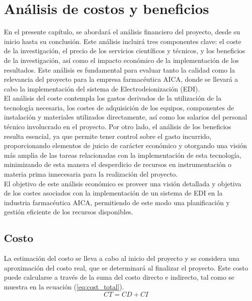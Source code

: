 \chapter{Análisis de costos y beneficios}
En el presente capítulo, se abordará el análisis financiero del proyecto, desde su inicio hasta su conclusión. Este análisis incluirá tres componentes clave: el coste de la investigación, el precio de los servicios científicos y técnicos, y los beneficios de la investigación, así como el impacto económico de la implementación de los resultados. Este análisis es fundamental para evaluar tanto la calidad como la relevancia del proyecto para la empresa farmacéutica AICA, donde se llevará a cabo la implementación del sistema de Electrodeionización (EDI).\\

El análisis del coste contempla los gastos derivados de la utilización de la tecnología necesaria, los costes de adquisición de los equipos, componentes de instalación y materiales utilizados directamente, así como los salarios del personal técnico involucrado en el proyecto. Por otro lado, el análisis de los beneficios resulta esencial, ya que permite tener control sobre el gasto incurrido, proporcionando elementos de juicio de carácter económico y otorgando una visión más amplia de las tareas relacionadas con la implementación de esta tecnología, minimizando de esta manera el desperdicio de recursos en instrumentación o materia prima innecesaria para la realización del proyecto.\\

El objetivo de este análisis económico es proveer una visión detallada y objetiva de los costes asociados con la implementación de un sistema de EDI en la industria farmacéutica AICA, permitiendo de este modo una planificación y gestión eficiente de los recursos disponibles.\\


\section{Costo}

La estimación del costo se lleva a cabo al inicio del proyecto y se considera una aproximación del costo real, que se determinará al finalizar el proyecto. Este costo puede calcularse a través de la suma del costo directo e indirecto, tal como se muestra en la ecuación (\ref{eq:cost_total}). \\

\begin{equation}
    \label{eq:cost_total}
    CT = CD + CI
\end{equation}

